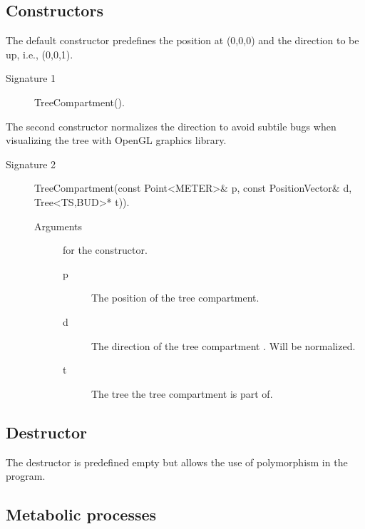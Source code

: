 \subsection{Constructors}

The default constructor predefines the position at (0,0,0) and
the  direction  to be  up,   i.e.,  (0,0,1). 
\begin{description}
    \item [Signature 1] TreeCompartment().
\end{description}

The second constructor normalizes the direction to avoid subtile bugs
when visualizing the tree with OpenGL graphics library.
\begin{description}
    \item [Signature 2] TreeCompartment(const Point<METER>\& p, const
    PositionVector\& d, Tree<TS,BUD>* t)).
    \begin{description}
        \item [Arguments] for the constructor.
        \begin{description}
            \item [p] The position of the tree compartment.
            \item [d] The direction of the tree compartment . Will be
    normalized.
            \item [t] The tree the tree compartment is part of.
         \end{description}
    \end{description} 
\end{description}

\subsection{Destructor}

The destructor is predefined empty but allows the use of polymorphism
in the program.

\subsection{Metabolic processes}

